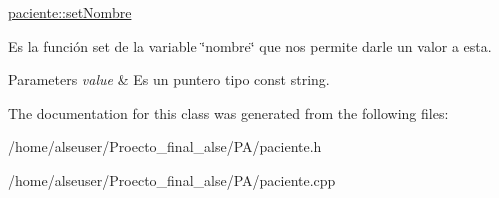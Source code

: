 \hyperlink{classpaciente_aa1c002ee279da1512c06a30ab6f36cf8}{paciente\+::set\+Nombre} 

Es la función set de la variable \char`\"{}nombre\char`\"{} que nos permite darle un valor a esta. 
\begin{DoxyParams}{Parameters}
{\em value} & Es un puntero tipo const string. \\
\hline
\end{DoxyParams}


The documentation for this class was generated from the following files\+:\begin{DoxyCompactItemize}
\item 
/home/alseuser/\+Proecto\+\_\+final\+\_\+alse/\+P\+A/paciente.\+h\item 
/home/alseuser/\+Proecto\+\_\+final\+\_\+alse/\+P\+A/paciente.\+cpp\end{DoxyCompactItemize}
